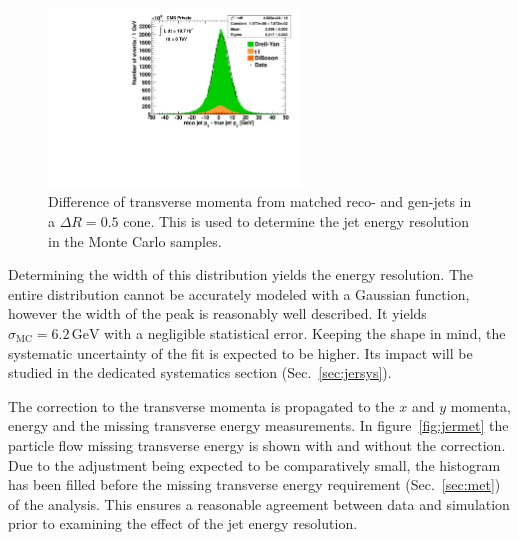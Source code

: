{\begin{figure}[htb!]
  \centering
  \includegraphics[width=0.6\textwidth]{plots/jer_deltapt.pdf}
  \caption{Difference of transverse momenta from matched reco- and gen-jets in a $\Delta R = 0.5$ cone. This is used to determine the jet energy resolution in the Monte Carlo samples.}
  \label{fig:jerdeltapt}
\end{figure}

\noindent Determining the width of this distribution yields the energy resolution. The entire distribution cannot be accurately modeled with a Gaussian function, however the width of the peak is reasonably well described. It yields $\sigma_{\text{MC}} = 6.2\,\text{GeV}$ with a negligible statistical error. Keeping the shape in mind, the systematic uncertainty of the fit is expected to be higher. Its impact will be studied in the dedicated systematics section (Sec.~\ref{sec:jersys}).

The correction to the transverse momenta is propagated to the $x$ and $y$ momenta, energy and the missing transverse energy measurements. In figure~\ref{fig:jermet} the particle flow missing transverse energy is shown with and without the correction. Due to the adjustment being expected to be comparatively small, the histogram has been filled before the missing transverse energy requirement (Sec.~\ref{sec:met}) of the analysis. This ensures a reasonable agreement between data and simulation prior to examining the effect of the jet energy resolution.

}
